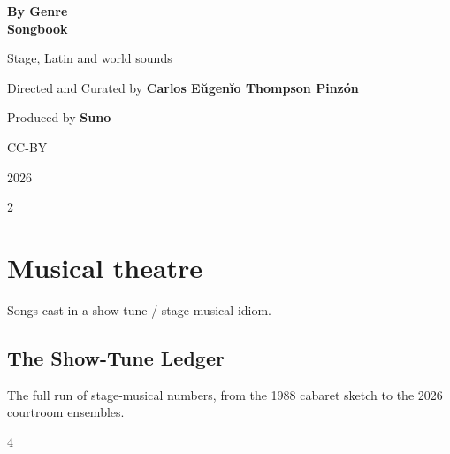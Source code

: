 \documentclass[a4paper,landscape]{memoir}
\begin{document}
\frontmatter
{}

\begin{titlingpage}
\centering
\vspace*{\fill}
{\LARGE\bfseries By Genre\\\Huge Songbook\par}
\bigskip
{\large Stage, Latin and world sounds\par}
\vspace*{\fill}
{\normalsize Directed and Curated by \bfseries Carlos Eŭgenĭo Thompson Pinzón\par}
{\normalsize Produced by \bfseries Suno\par}
\bigskip
{\normalsize CC-BY\par}
{\normalsize 2026\par}
\vspace*{\fill}
\end{titlingpage}

\clearpage\begin{multicols*}{2}
\tableofcontents*
\end{multicols*}
\mainmatter
\renewcommand\chaptername{Album~}

\part{Musical theatre}
Songs cast in a show-tune / stage-musical idiom.

\chapter{The Show-Tune Ledger}
The full run of stage-musical numbers, from the 1988 cabaret sketch to the 2026 courtroom ensembles.
\clearpage\begin{multicols*}{4}
\end{multicols*}
\end{document}
